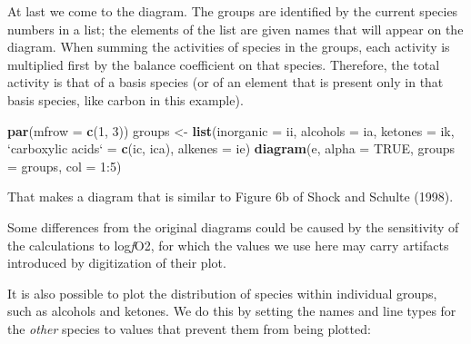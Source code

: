 \documentclass[]{tufte-book}
\newenvironment{Shaded}{}{}
\newcommand{\KeywordTok}[1]{\textcolor[rgb]{0.00,0.44,0.13}{\textbf{#1}}}
\newcommand{\DataTypeTok}[1]{\textcolor[rgb]{0.56,0.13,0.00}{#1}}
\newcommand{\DecValTok}[1]{\textcolor[rgb]{0.25,0.63,0.44}{#1}}
\newcommand{\StringTok}[1]{\textcolor[rgb]{0.25,0.44,0.63}{#1}}
\newcommand{\OtherTok}[1]{\textcolor[rgb]{0.00,0.44,0.13}{#1}}
\newcommand{\OperatorTok}[1]{\textcolor[rgb]{0.40,0.40,0.40}{#1}}
\newcommand{\NormalTok}[1]{#1}
\begin{document}
At last we come to the diagram. The groups are identified by the current
species numbers in a list; the elements of the list are given names that
will appear on the diagram. When summing the activities of species in
the groups, each activity is multiplied first by the balance coefficient
on that species. Therefore, the total activity is that of a basis
species (or of an element that is present only in that basis species,
like carbon in this example).

\begin{Shaded}
\begin{Highlighting}[]
\KeywordTok{par}\NormalTok{(}\DataTypeTok{mfrow =} \KeywordTok{c}\NormalTok{(}\DecValTok{1}\NormalTok{, }\DecValTok{3}\NormalTok{))}
\NormalTok{groups <-}\StringTok{ }\KeywordTok{list}\NormalTok{(}\DataTypeTok{inorganic =}\NormalTok{ ii, }\DataTypeTok{alcohols =}\NormalTok{ ia, }\DataTypeTok{ketones =}\NormalTok{ ik,}
               \StringTok{`}\DataTypeTok{carboxylic acids}\StringTok{`}\NormalTok{ =}\StringTok{ }\KeywordTok{c}\NormalTok{(ic, ica), }\DataTypeTok{alkenes =}\NormalTok{ ie)}
\KeywordTok{diagram}\NormalTok{(e, }\DataTypeTok{alpha =} \OtherTok{TRUE}\NormalTok{, }\DataTypeTok{groups =}\NormalTok{ groups, }\DataTypeTok{col =} \DecValTok{1}\OperatorTok{:}\DecValTok{5}\NormalTok{)}
\end{Highlighting}
\end{Shaded}

That makes a diagram that is similar to Figure 6b of Shock and Schulte
(1998).

\begin{marginfigure}
Some differences from the original diagrams could be caused by the
sensitivity of the calculations to log\emph{f}O2, for which the values
we use here may carry artifacts introduced by digitization of their
plot.
\end{marginfigure}

It is also possible to plot the distribution of species within
individual groups, such as alcohols and ketones. We do this by setting
the names and line types for the \emph{other} species to values that
prevent them from being plotted:
\end{document}
